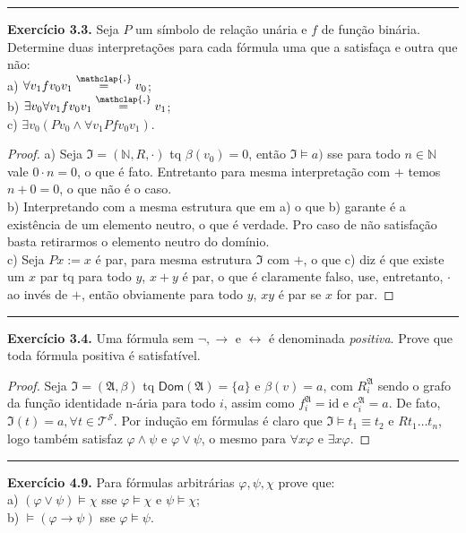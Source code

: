 \documentclass[11pt]{article}
\newcommand{\mc}[1]{\mathcal{#1}}
\newcommand{\mf}[1]{\mathfrak{#1}}
\newcommand{\msf}[1]{\mathsf{#1}}
\newcommand{\mbb}[1]{\mathbb{#1}}
\newcommand\overtext[2]{\stackrel{\mathclap{\normalfont\mbox{#1}}}{#2}}
\begin{document}
\hrule

\begin{shaded}
\textbf{Exercício 3.3.} Seja $P$ um símbolo de relação unária e $f$ de função binária. Determine duas interpretações para cada fórmula uma que a satisfaça e outra que não:\\
a) $\forall v_1fv_0v_1\overtext{.}{=}v_0$;\\
b) $\exists v_0\forall v_1fv_0v_1\overtext{.}{=}v_1$;\\
c) $\exists v_0(Pv_0\wedge\forall v_1Pfv_0v_1)$.
\end{shaded}

\begin{proof}
    a) Seja $\mf{I}=(\mbb{N},R,\cdot)$ tq $\beta(v_0)=0$, então $\mf{I}\vDash a)$ sse para todo $n\in\mbb{N}$ vale $0\cdot n=0$, o que é fato. Entretanto para mesma interpretação com $+$ temos $n+0=0$, o que não é o caso.\\
    b) Interpretando com a mesma estrutura que em a) o que b) garante é a existência de um elemento neutro, o que é verdade. Pro caso de não satisfação basta retirarmos o elemento neutro do domínio.\\
    c) Seja $Px:=x$ é par, para mesma estrutura $\mf{I}$ com $+$, o que c) diz é que existe um $x$ par tq para todo $y$, $x+y$ é par, o que é claramente falso, use, entretanto, $\cdot$ ao invés de $+$, então obviamente para todo $y$, $xy$ é par se $x$ for par.
\end{proof}

\hrule

\begin{shaded}
\textbf{Exercício 3.4.} Uma fórmula sem $\neg,\to$ e $\leftrightarrow$ é denominada \textit{positiva}. Prove que toda fórmula positiva é satisfatível.
\end{shaded}

\begin{proof}
    Seja $\mf{I}=(\mf{A},\beta)$ tq $\msf{Dom}(\mf{A})=\{a\}$ e $\beta(v)=a$, com $R_i^\mf{A}$ sendo o grafo da função identidade n-ária para todo $i$, assim como $f_i^\mf{A}=\text{id}$ e $c_i^\mf{A}=a$. De fato, $\mf{I}(t)=a,\forall t \in\mc{T}^\mc{S}$. Por indução em fórmulas é claro que $\mf{I}\vDash t_1\equiv t_2$ e $Rt_1\dots t_n$, logo também satisfaz $\varphi\wedge\psi$ e $\varphi\vee\psi$, o mesmo para $\forall x\varphi$ e $\exists x \varphi$.
\end{proof}

\hrule

\begin{shaded}
\textbf{Exercício 4.9.}
Para fórmulas arbitrárias $\varphi,\psi,\chi$ prove que:\\
a) $(\varphi\vee\psi)\vDash\chi$ sse $\varphi\vDash\chi$ e $\psi\vDash\chi$;\\
b) $\vDash(\varphi\to\psi)$ sse $\varphi\vDash\psi$.
\end{shaded}
\end{document}
